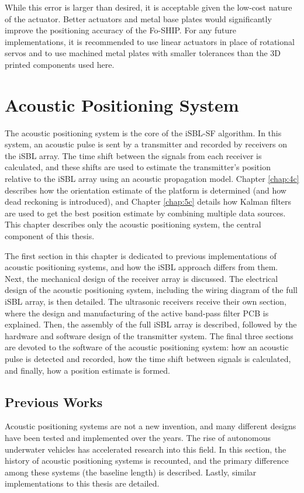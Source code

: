\documentclass[11pt]{ucthesisCP}
\begin{document}
While this error is larger than desired, it is acceptable given the low-cost nature of the actuator. Better actuators and metal base plates would significantly improve the positioning accuracy of the Fo-SHIP. For any future implementations, it is recommended to use linear actuators in place of rotational servos and to use machined metal plates with smaller tolerances than the 3D printed components used here.










\chapter{Acoustic Positioning System} \label{chap:3c}
The acoustic positioning system is the core of the iSBL-SF algorithm. In this system, an acoustic pulse is sent by a transmitter and recorded by receivers on the iSBL array. The time shift between the signals from each receiver is calculated, and these shifts are used to estimate the transmitter’s position relative to the iSBL array using an acoustic propagation model. Chapter \ref{chap:4c} describes how the orientation estimate of the platform is determined (and how dead reckoning is introduced), and Chapter \ref{chap:5c} details how Kalman filters are used to get the best position estimate by combining multiple data sources. This chapter describes only the acoustic positioning system, the central component of this thesis.

The first section in this chapter is dedicated to previous implementations of acoustic positioning systems, and how the iSBL approach differs from them. Next, the mechanical design of the receiver array is discussed. The electrical design of the acoustic positioning system, including the wiring diagram of the full iSBL array, is then detailed. The ultrasonic receivers receive their own section, where the design and manufacturing of the active band-pass filter PCB is explained. Then, the assembly of the full iSBL array is described, followed by the hardware and software design of the transmitter system. The final three sections are devoted to the software of the acoustic positioning system: how an acoustic pulse is detected and recorded, how the time shift between signals is calculated, and finally, how a position estimate is formed.

\section{Previous Works} \label{sec:3s1}
Acoustic positioning systems are not a new invention, and many different designs have been tested and implemented over the years. The rise of autonomous underwater vehicles has accelerated research into this field. In this section, the history of acoustic positioning systems is recounted, and the primary difference among these systems (the baseline length) is described. Lastly, similar implementations to this thesis are detailed.
\end{document}
